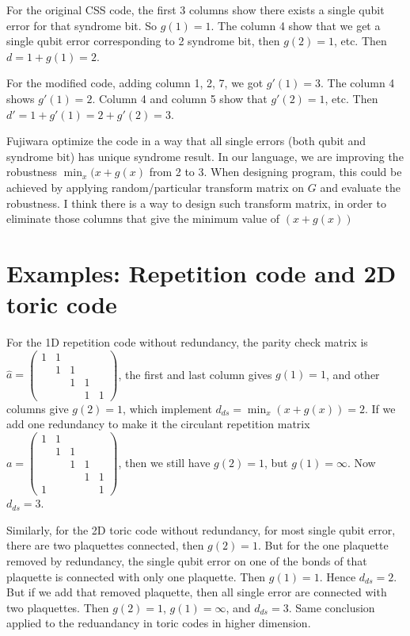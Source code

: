 \documentclass[aps,prb,12pt,tightenlines,%
notitlepage,longbibliography]{revtex4-1}
\begin{document}
For the original CSS code, the first 3 columns show there exists a single qubit error for that syndrome bit. So $g(1)=1$.  The column 4 show that we get a single qubit error corresponding to 2 syndrome bit, then $g(2)=1$, etc. Then $d=1+g(1)=2$. 

For the modified code, adding column 1, 2, 7, we got $g'(1)=3$. The column 4 shows $g'(1)=2$. Column 4 and column 5 show that $g'(2)=1$, etc. Then $d'=1+g'(1)=2+g'(2)=3$.

Fujiwara optimize the code in a way that all single errors (both qubit and syndrome bit) has unique syndrome result. In our language, we are improving the robustness $\min_x (x+g(x)$ from 2 to 3. When designing program, this could be achieved by applying random/particular transform matrix on $G$ and evaluate the robustness. I think there is a way to design such transform matrix, in order to eliminate those columns that give the minimum value of $(x+g(x))$


\section{Examples: Repetition code and 2D toric code}
For the 1D repetition code without redundancy, the parity check matrix is
$\hat a=\left( \begin{array}{ccccc}1 & 1 \\  & 1 & 1 & \\ &&1 &1\\ &&&1&1\end{array} \right)$, the first and last column gives $g(1)=1$, and other columns give $g(2)=1$, which implement $d_{ds}=\min_x(x+g(x))=2$. If we add one redundancy to make it the circulant repetition matrix $a=\left( \begin{array}{ccccc}1 & 1 \\  & 1 & 1 & \\ &&1 &1\\ &&&1&1\\ 1 &&&&1\end{array} \right)$, then we still have $g(2)=1$, but $g(1)=\infty$. Now $d_{ds}=3$.

Similarly, for the 2D toric code without redundancy, for most single qubit error, there are two plaquettes connected, then $g(2)=1$. But for the one plaquette removed by redundancy, the single qubit error on one of the bonds of that plaquette is connected with only one plaquette. Then $g(1)=1$. Hence $d_{ds}=2$. But if we add that removed plaquette, then all single error are connected with two plaquettes. Then $g(2)=1$, $g(1)=\infty$, and $d_{ds}=3$. Same conclusion applied to the reduandancy in toric codes in higher dimension.
\end{document}
